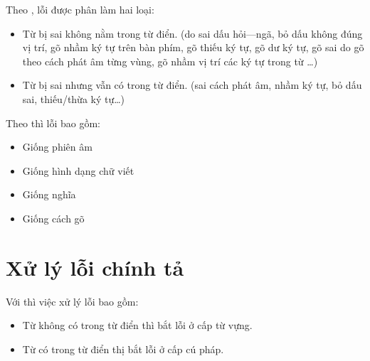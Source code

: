 \documentclass[a4paper,oneside]{book} %
\begin{document}
\noindent Theo \cite{Tuoi}, lỗi được phân làm hai loại:
\begin{itemize}
\item Từ bị sai không nằm trong từ điển. (do sai dấu hỏi---ngã, bỏ dấu
  không đúng vị trí, gõ nhầm ký tự trên bàn phím, gõ thiếu ký tự, gõ
  dư ký tự, gõ sai do gõ theo cách phát âm từng vùng, gõ nhầm vị trí
  các ký tự trong từ \ldots)
\item Từ bị sai nhưng vẫn có trong từ điển. (sai cách phát âm, nhầm ký
  tự, bỏ dấu sai, thiếu/thừa ký tự\ldots)
\end{itemize}

\noindent Theo \cite{Chang} thì lỗi bao gồm:
\begin{itemize}
\item Giống phiên âm
\item Giống hình dạng chữ viết
\item Giống nghĩa
\item Giống cách gõ
\end{itemize}

\section{Xử lý lỗi chính tả}

Với \cite{Tuoi} thì việc xử lý lỗi bao gồm:
\begin{itemize}
\item Từ không có trong từ điển thì bắt lỗi ở cấp từ vựng.
\item Từ có trong từ điển thị bắt lỗi ở cấp cú pháp.
\end{itemize}


\end{document}
